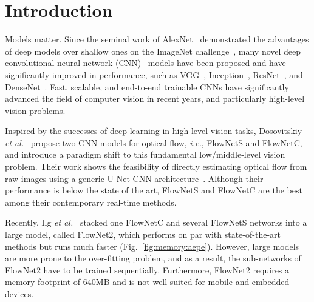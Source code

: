 \documentclass[10pt,journal,cspaper,compsoc]{IEEEtran}
\def\ie{\emph{i.e.}\xspace} \def\Ie{\emph{I.e.}\xspace}
\def\etal{\emph{et al.}\xspace}
\begin{document}
\ifCLASSOPTIONcaptionsoff
  \newpage
\fi


\renewcommand{\paragraph}[1]{\textbf{#1}}


	\section{Introduction}
	
	Models matter. Since the seminal work of AlexNet~\cite{krizhevsky2012imagenet} demonstrated the advantages of deep models over shallow ones on the ImageNet  challenge~\cite{russakovsky2015imagenet}, many novel deep convolutional neural network (CNN)~\cite{Lecun1989Backpropagation} models have been proposed and have significantly improved in performance, such as VGG~\cite{simonyan2014very}, Inception~\cite{szegedy2015going}, ResNet~\cite{He2016Deep}, and DenseNet~\cite{huang2016densely}. Fast, scalable, and end-to-end trainable CNNs have significantly advanced the field of computer vision in recent years, and particularly high-level vision problems. 
	
	Inspired by the successes of deep learning in high-level vision tasks, Dosovitskiy \etal~\cite{Dosovitskiy:2015Flownet} propose two CNN models for optical flow, \ie, FlowNetS and FlowNetC, and introduce a paradigm shift to this fundamental low/middle-level vision problem. Their work shows the feasibility of directly estimating optical flow from raw images using a generic U-Net CNN architecture~\cite{ronneberger2015u}. Although their performance is below the state of the art, FlowNetS and FlowNetC are the best among their contemporary real-time methods.
	
	

	Recently, Ilg \etal~\cite{Ilg:2016:Flownet2} stacked one FlowNetC and several FlowNetS networks into a large model, called FlowNet2, which performs on par with state-of-the-art methods but runs much faster (Fig.~\ref{fig:memory:aepe}). 
	However, large models are more prone to the over-fitting problem, and as a result, the sub-networks of FlowNet2 have to be trained sequentially. Furthermore, FlowNet2 requires a memory footprint of 640MB and is not well-suited for mobile and embedded devices.
	
\end{document}
